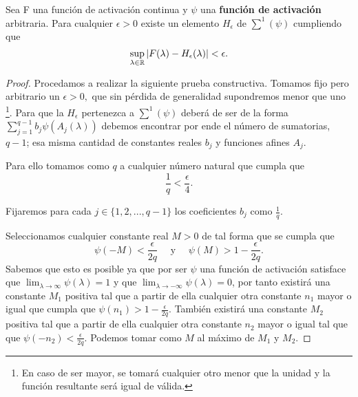 \begin{lema}\label{lema:a_2_paso_previo_denso}
    Sea F una función de activación continua y $\psi$ una \textbf{función de activación} arbitraria. 
    Para cualquier $\epsilon > 0$ existe un elemento $H_{\epsilon}$ de $\sum^1(\psi)$ cumpliendo que
    \begin{equation}
        \sup_{\lambda \in \mathbb{R}} | F(\lambda) - H_{\epsilon}(\lambda) | < \epsilon.
    \end{equation}
\end{lema} 
\begin{proof}
    Procedamos a realizar la siguiente prueba constructiva. 
    Tomamos fijo pero arbitrario un $\epsilon > 0,$ que sin pérdida de generalidad
    supondremos menor que uno 
    \footnote{En caso de ser mayor, se tomará cualquier otro menor que la unidad y la función resultante será igual de válida.}.
    Para que la $H_\epsilon$ pertenezca a $\sum ^1 (\psi)$ deberá de ser de la 
    forma $\sum^{q-1}_{j=1} b_j \psi( A_j(\lambda))$
    debemos encontrar por ende el número de sumatorias, $q-1$; esa misma cantidad de constantes reales $b_j$ y funciones afines $A_j$. 
    

    Para ello tomamos como $q$ a cualquier número natural que cumpla que 
    \begin{equation}\label{eq:lema_a_2_def_q}
        \frac{1}{q} < \frac{\epsilon}{4}.
    \end{equation}

    Fijaremos para cada $j \in \{1,2, ...,q-1\}$ los coeficientes  $b_j$ como $\frac{1}{q}$. 

    Seleccionamos cualquier constante real $M>0$ de tal forma que 
    se cumpla que
    \begin{equation}\label{lema_a_2_psi_m}
        \psi(-M) < \frac{\epsilon}{2q}
        \quad \text{ y } \quad
        \psi(M) > 1 - \frac{\epsilon}{2q}.
    \end{equation} 
    Sabemos que esto es posible ya que por ser $\psi$ una función de activación satisface que 
    $\lim_{\lambda \longrightarrow \infty} \psi(\lambda) = 1$ y que  $\lim_{\lambda \longrightarrow -\infty} \psi(\lambda) = 0$,
    por tanto existirá una constante $M_1$ positiva tal que a partir de ella cualquier
     otra constante $n_1$ mayor o igual que cumpla que 
    $\psi(n_1) > 1 - \frac{\epsilon}{2q}$. También existirá una constante $M_2$ positiva tal que a partir de 
    ella cualquier otra constante $n_2$ mayor o igual tal que que 
    $\psi(-n_2) < \frac{\epsilon}{2q}$. Podemos tomar como $M$ al máximo de $M_1$ y $M_2$.   


\end{proof}
